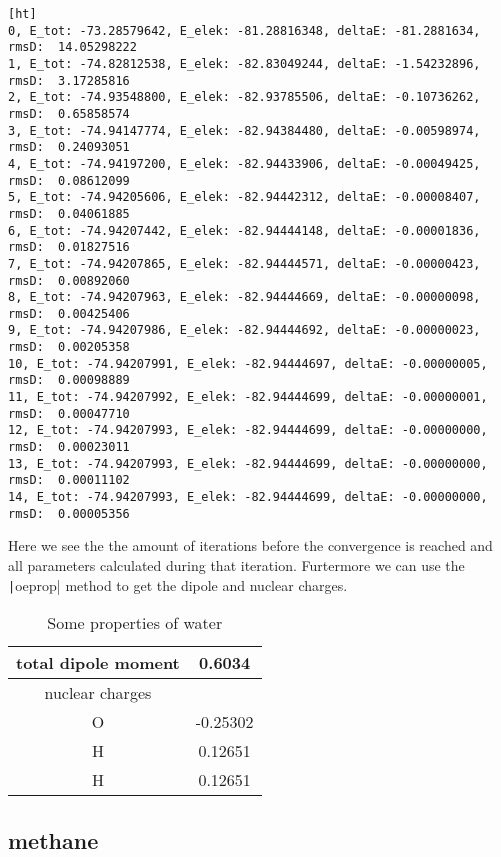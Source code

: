 \documentclass{article}
\begin{document}
\begin{verbatim}[ht]
0, E_tot: -73.28579642, E_elek: -81.28816348, deltaE: -81.2881634, rmsD:  14.05298222
1, E_tot: -74.82812538, E_elek: -82.83049244, deltaE: -1.54232896, rmsD:  3.17285816 
2, E_tot: -74.93548800, E_elek: -82.93785506, deltaE: -0.10736262, rmsD:  0.65858574 
3, E_tot: -74.94147774, E_elek: -82.94384480, deltaE: -0.00598974, rmsD:  0.24093051 
4, E_tot: -74.94197200, E_elek: -82.94433906, deltaE: -0.00049425, rmsD:  0.08612099
5, E_tot: -74.94205606, E_elek: -82.94442312, deltaE: -0.00008407, rmsD:  0.04061885
6, E_tot: -74.94207442, E_elek: -82.94444148, deltaE: -0.00001836, rmsD:  0.01827516
7, E_tot: -74.94207865, E_elek: -82.94444571, deltaE: -0.00000423, rmsD:  0.00892060
8, E_tot: -74.94207963, E_elek: -82.94444669, deltaE: -0.00000098, rmsD:  0.00425406
9, E_tot: -74.94207986, E_elek: -82.94444692, deltaE: -0.00000023, rmsD:  0.00205358
10, E_tot: -74.94207991, E_elek: -82.94444697, deltaE: -0.00000005, rmsD:  0.00098889
11, E_tot: -74.94207992, E_elek: -82.94444699, deltaE: -0.00000001, rmsD:  0.00047710
12, E_tot: -74.94207993, E_elek: -82.94444699, deltaE: -0.00000000, rmsD:  0.00023011
13, E_tot: -74.94207993, E_elek: -82.94444699, deltaE: -0.00000000, rmsD:  0.00011102
14, E_tot: -74.94207993, E_elek: -82.94444699, deltaE: -0.00000000, rmsD:  0.00005356
\end{verbatim}
Here we see the the amount of iterations before the convergence is reached and all parameters calculated during that iteration. Furtermore we can use the \texttt|oeprop| method to get the dipole and nuclear charges.
\begin{table}[ht]
    \centering
    \begin{tabular}{c|c}
         total dipole moment & 0.6034  \\
         \hline
         nuclear charges &  \\ 
         \hline
         O & -0.25302 \\
         H & 0.12651 \\
         H & 0.12651 \\
    \end{tabular}
    \caption{Some properties of water}
    \label{tab:number2}
\end{table}
 
\subsection{methane}
\label{subsec:methane}
 
\end{document}
